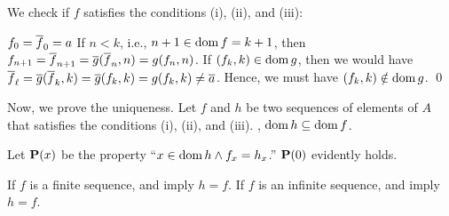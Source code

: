 \documentclass[../introduction_to_set_theory.tex]{subfiles}
\begin{document}
{{        We check if \(f\) satisfies the conditions (i), (ii), and (iii):
        \begin{enumerate}[nolistsep, label=(\roman*), leftmargin=*]
            \ii \(f_0 = \overline{f}_0 = a\)
            \ii
            If \(n < k\), i.e., \(n + 1 \in \operatorname{dom} f = k + 1\),
            then \(f_{n+1} = \overline{f}_{n+1} = \overline g(\overline{f}_n, n) = g(f_n, n)\).
            \ii
            If \((f_k, k) \in \operatorname{dom} g\), then we would have
            \(\overline{f}_\ell = \overline g(\overline{f}_k, k) = \overline g(f_k, k) = g(f_k, k) \neq \overline{a}\).
            Hence, we must have \((f_k, k) \notin \operatorname{dom} g\). \qed
        \end{enumerate}
    }

    Now, we prove the uniqueness.
    Let \(f\) and \(h\) be two sequences of elements of \(A\)
    that satisfies the conditions (i), (ii), and (iii).
    \WLOG, \(\operatorname{dom} h \subseteq \operatorname{dom} f\).

    Let \(\bm{\mathrm{P}}(x)\) be the property ``\(x \in \operatorname{dom} h \land f_x = h_x\).''
    \(\bm{\mathrm{P}}(0)\) evidently holds.

    If \(f\) is a finite sequence,  and 
    imply \(h = f\).
    If \(f\) is an infinite sequence,  and 
    imply \(h = f\).
}
\end{document}
